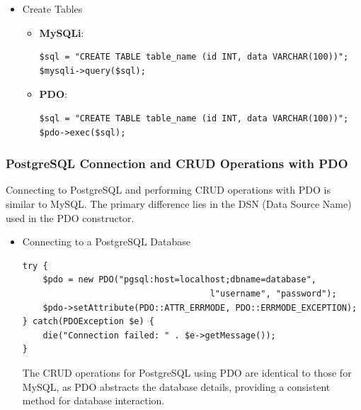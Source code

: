 \documentclass[11pt]{article}
\begin{document}
\begin{itemize}
\begin{itemize}
\begin{verbatim}
$sql = "DELETE FROM table_name WHERE condition";
$mysqli->query($sql);
\end{verbatim}

\item \textbf{PDO}:

\begin{verbatim}
$sql = "DELETE FROM table_name WHERE condition";
$pdo->exec($sql);
\end{verbatim}
\end{itemize}

\item Create Tables
\label{sec:orgee2bf01}
\begin{itemize}
\item \textbf{MySQLi}:

\begin{verbatim}
$sql = "CREATE TABLE table_name (id INT, data VARCHAR(100))";
$mysqli->query($sql);
\end{verbatim}

\item \textbf{PDO}:

\begin{verbatim}
$sql = "CREATE TABLE table_name (id INT, data VARCHAR(100))";
$pdo->exec($sql);
\end{verbatim}
\end{itemize}
\end{itemize}

\subsubsection{PostgreSQL Connection and CRUD Operations with PDO}
\label{sec:org709bbec}
Connecting to PostgreSQL and performing CRUD operations with PDO is
similar to MySQL. The primary difference lies in the DSN (Data Source
Name) used in the PDO constructor.

\begin{itemize}
\item Connecting to a PostgreSQL Database
\label{sec:orgbafb765}
\begin{verbatim}
try {
    $pdo = new PDO("pgsql:host=localhost;dbname=database",
                                     l"username", "password");
    $pdo->setAttribute(PDO::ATTR_ERRMODE, PDO::ERRMODE_EXCEPTION);
} catch(PDOException $e) {
    die("Connection failed: " . $e->getMessage());
}
\end{verbatim}

The CRUD operations for PostgreSQL using PDO are identical to those for
MySQL, as PDO abstracts the database details, providing a consistent
method for database interaction.
\end{itemize}
\end{document}
